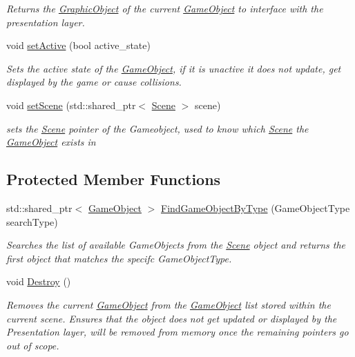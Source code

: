 \begin{DoxyCompactItemize}
\begin{DoxyCompactList}\small\item\em Returns the \hyperlink{class_graphic_object}{Graphic\+Object} of the current \hyperlink{class_game_object}{Game\+Object} to interface with the presentation layer. \end{DoxyCompactList}\item 
void \hyperlink{class_game_object_a200218792aa0076011d69be696e3d3d4}{set\+Active} (bool active\+\_\+state)
\begin{DoxyCompactList}\small\item\em Sets the active state of the \hyperlink{class_game_object}{Game\+Object}, if it is unactive it does not update, get displayed by the game or cause collisions. \end{DoxyCompactList}\item 
void \hyperlink{class_game_object_a9e1420c027ce937f9958a41ad280080b}{set\+Scene} (std\+::shared\+\_\+ptr$<$ \hyperlink{class_scene}{Scene} $>$ scene)
\begin{DoxyCompactList}\small\item\em sets the \hyperlink{class_scene}{Scene} pointer of the Gameobject, used to know which \hyperlink{class_scene}{Scene} the \hyperlink{class_game_object}{Game\+Object} exists in \end{DoxyCompactList}\end{DoxyCompactItemize}
\subsection*{Protected Member Functions}
\begin{DoxyCompactItemize}
\item 
std\+::shared\+\_\+ptr$<$ \hyperlink{class_game_object}{Game\+Object} $>$ \hyperlink{class_game_object_ac52291835ad2f3f36363589af0d3ae84}{Find\+Game\+Object\+By\+Type} (Game\+Object\+Type search\+Type)
\begin{DoxyCompactList}\small\item\em Searches the list of available Game\+Objects from the \hyperlink{class_scene}{Scene} object and returns the first object that matches the specifc Game\+Object\+Type. \end{DoxyCompactList}\item 
\mbox{\label{class_game_object_abf1959fad10ea04673a182029f1f81b9}} 
void \hyperlink{class_game_object_abf1959fad10ea04673a182029f1f81b9}{Destroy} ()
\begin{DoxyCompactList}\small\item\em Removes the current \hyperlink{class_game_object}{Game\+Object} from the \hyperlink{class_game_object}{Game\+Object} list stored within the current scene. Ensures that the object does not get updated or displayed by the Presentation layer, will be removed from memory once the remaining pointers go out of scope. \end{DoxyCompactList}\end{DoxyCompactItemize}
